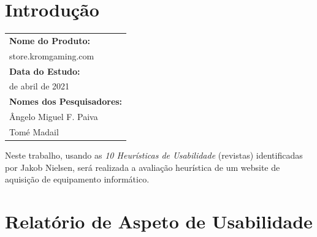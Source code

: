 \documentclass[11pt]{article}
\begin{document}
	
	
	\tableofcontents
	\pagebreak
	
	\large
	\section{Introdução}
	
	\normalsize
	\begin{center}
		\begin{tabularx}{\textwidth}{ | >{\raggedright\arraybackslash}X | }
			\hline
			\textbf{Nome do Produto:} \\ 
			store.kromgaming.com \\ \hline
			\textbf{Data do Estudo:} \\ 
			25 de abril de 2021 \\ \hline
			\textbf{Nomes dos Pesquisadores:} \\ 
			Ângelo Miguel F. Paiva \\ 
			Tomé Madail \\ \hline   
		\end{tabularx}
	\end{center}
	
	Neste trabalho, usando as \textit{10 Heurísticas de Usabilidade} (revistas) identificadas por Jakob Nielsen, será realizada a avaliação heurística de um website de aquisição de equipamento informático.
	
	\large
	\section{Relatório de Aspeto de Usabilidade}
	
\end{document}
